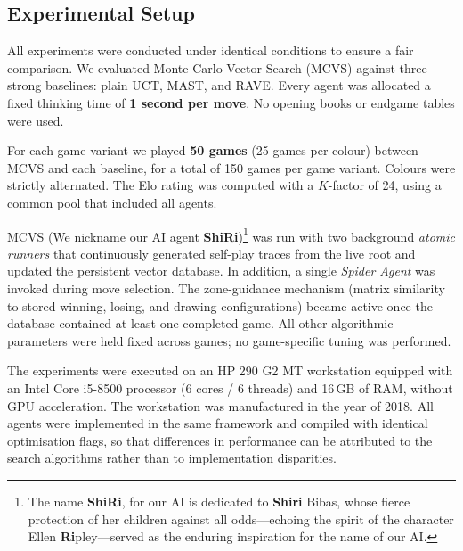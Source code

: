\documentclass[11pt,a4paper]{article}
\theoremstyle{plain}
\theoremstyle{definition}
\begin{document}
\subsection{Experimental Setup}

\vspace{0.5em}

All experiments were conducted under identical conditions to ensure a fair comparison. We evaluated Monte Carlo Vector Search (MCVS) against three strong baselines: plain UCT, MAST, and RAVE. Every agent was allocated a fixed thinking time of \textbf{1 second per move}. No opening books or endgame tables were used.

\vspace{0.5em}

For each game variant we played \textbf{50 games} (25 games per colour) between MCVS and each baseline, for a total of 150 games per game variant. Colours were strictly alternated. The Elo rating was computed with a $K$-factor of 24, using a common pool that included all agents.

\vspace{0.5em}

MCVS (We nickname our AI agent \textbf{ShiRi})\footnote{The name \textbf{ShiRi}, for our AI is dedicated to \textbf{Shiri} Bibas, whose fierce protection of her children against all odds—echoing the spirit of the character Ellen \textbf{Ri}pley—served as the enduring inspiration for the name of our AI.} was run with two background \emph{atomic runners} that continuously generated self-play traces from the live root and updated the persistent vector database. In addition, a single \emph{Spider Agent} was invoked during move selection. The zone-guidance mechanism (matrix similarity to stored winning, losing, and drawing configurations) became active once the database contained at least one completed game. All other algorithmic parameters were held fixed across games; no game-specific tuning was performed.

\vspace{0.5em}

The experiments were executed on an HP 290 G2 MT workstation equipped with an Intel Core i5-8500 processor (6 cores / 6 threads) and 16\,GB of RAM, without GPU acceleration. The workstation was manufactured in the year of 2018. All agents were implemented in the same framework and compiled with identical optimisation flags, so that differences in performance can be attributed to the search algorithms rather than to implementation disparities.
\end{document}
